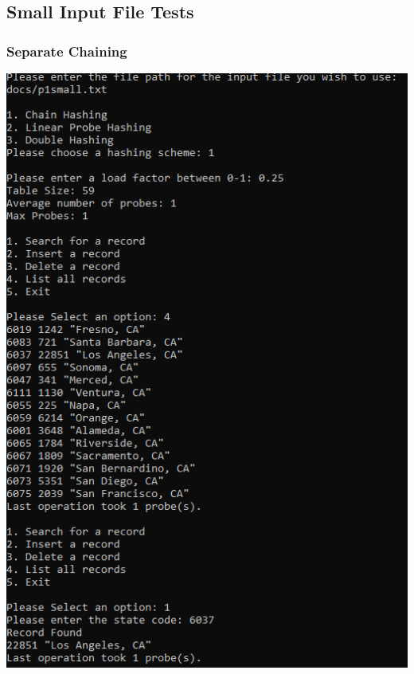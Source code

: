 \documentclass[titlepage]{article}
\begin{document}
\subsection{Small Input File Tests}
\subsubsection{Separate Chaining}

\includegraphics[]{Small_Input/LF_0_25/ChainHash_1.png}   \newpage
\end{document}
